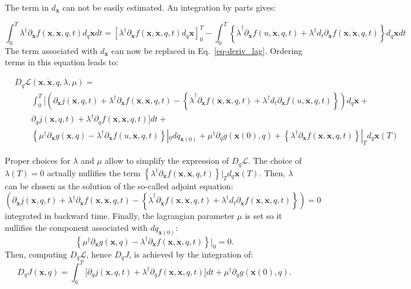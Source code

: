 \documentclass[aip,pof,nofootinbib,reprint,onecolumn]{revtex4-1}
\newcommand{\gras}[1]{\boldsymbol{#1}}
\newcommand{\mypar}[1]{\left(#1\right)}
\newcommand{\mya}[1]{\left\{#1\right\}}
\newcommand{\fdyn}{f} %
\newcommand{\costf}{J} %
\newcommand{\costff}{j} %
\newcommand{\lag}{\mathcal{L}} %
\newcommand{\point}{\gras{x}} %
\begin{document}
The term in $d_{\dot{\point}}$ can not be easily estimated. An integration by parts gives:

$$\int_0^T\lambda^{\dagger}\partial_{\dot{\point}} \fdyn(\point,\dot{\point},q,t)d_q \dot{\point} dt = [\lambda^{\dagger}\partial_{\dot{\point}} \fdyn(\point,\dot{\point},q,t) d_q \point ]_0^T - \int_0^T \mya{\dot{\lambda}^{\dagger}\partial_{\dot{\point}} \fdyn(u,\dot{\point},q,t) + \lambda^{\dagger}d_t\partial_{\dot{\point}}\fdyn(\point,\dot{\point},q,t)}d_q \point dt$$
The term associated with $d_{\dot{\point}}$ can now be replaced in Eq.~\eqref{eq-deriv_lag}.
Ordering terms in this equation leads to:

\begin{equation}
\begin{split}
&D_q\lag\mypar{\point,\dot{\point},q,\lambda,\mu} = \\
& \qquad \int_0^T  \bigg[  \mypar{\partial_{\point}\costff(\point,q,t) + \lambda^{\dagger} \partial_{\point}  \fdyn(\point,\dot{\point},q,t) - \mya{\dot{\lambda}^{\dagger}\partial_{\dot{\point}} \fdyn(\point,\dot{\point},q,t) + \lambda^{\dagger}d_t\partial_{\dot{\point}}\fdyn(u,\dot{\point},q,t)}} d_q \point   +\\
& \qquad \partial_{q} \costff(\point,q,t)    + \lambda^{\dagger}\partial_q\fdyn(\point,\dot{\point},q,t) \bigg] dt + \\
& \qquad \mya{\mu^{\dagger} \partial_{\point} g(\point,q) - \lambda^{\dagger}\partial_{\dot{\point}} \fdyn(u,\dot{\point},q,t) }|_0 dq_{\point(0)}  + \mu^{\dagger} \partial_q g(\point(0),q) + \mya{\lambda^{\dagger}\partial_{\dot{\point}} \fdyn(\point,\dot{\point},q,t)}|_T d_q \point(T)
\end{split}
\label{eq-deriv_ord}
\end{equation}

Proper choices for $\lambda$ and $\mu$ allow to simplify the expression of $D_q\lag$.
The choice of $\lambda\mypar{T} = 0$ actually nullifies the term $\mya{\lambda^{\dagger}\partial_{\dot{\point}} \fdyn(\point,\dot{\point},q,t)}|_T d_q \point(T)$.
Then, $\lambda$ can be chosen as the solution of the so-called adjoint equation:
$$
\mypar{\partial_{\point}\costff(\point,q,t) + \lambda^{\dagger} \partial_{\point}  \fdyn(\point,\dot{\point},q,t) - \mya{\dot{\lambda}^{\dagger}\partial_{\dot{\point}} \fdyn(\point,\dot{\point},q,t) + \lambda^{\dagger}d_t\partial_{\dot{\point}}\fdyn(\point,\dot{\point},q,t)}} = 0 
$$
integrated in backward time. 
Finally, the lagrangian parameter $\mu$ is set so it nullifies the component associated with $dq_{\point(0)}$:
$$ \mya{\mu^{\dagger} \partial_{\point} g(\point,q) - \lambda^{\dagger}\partial_{\dot{\point}} \fdyn(\point,\dot{\point},q,t) }|_0 = 0.$$
Then, computing $D_q\lag$, hence $ D_q\costf$, is achieved by the integration of:
\begin{equation}
D_q\costf\mypar{\point,q} = \int_0^T  \bigg[  \partial_{q} \costff(\point,q,t)    + \lambda^{\dagger}\partial_q\fdyn(\point,\dot{\point},q,t) \bigg] dt +   \mu^{\dagger} \partial_q g(\point(0),q).
\label{eq-J_adj}
\end{equation}
\end{document}

